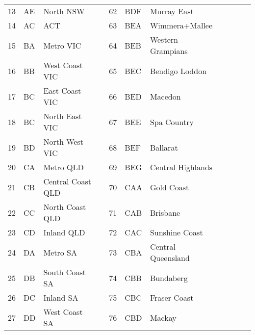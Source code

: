 \begin{table}[H]
{\begin{tabular}{lllllllllll}
				13	& AE & North NSW 			&  & 62  & BDF & Murray East &&&&\\
				14	& AC & ACT					&  & 63  & BEA & Wimmera+Mallee &&&&\\
				15	& BA & Metro VIC			&  & 64  & BEB & Western Grampians &&&&\\ 		
				16	& BB & West Coast VIC		&  & 65  & BEC & Bendigo Loddon &&&&\\
				17	& BC & East Coast VIC		&  & 66  & BED & Macedon &&&&\\ 
				18	& BC & North East VIC		&  & 67  & BEE & Spa Country &&&&\\ 
				19	& BD & North West VIC		&  & 68  & BEF & Ballarat &&&&\\
				20  & CA & Metro QLD			&  & 69  & BEG & Central Highlands &&&&\\
				21  & CB & Central Coast QLD	&  & 70  & CAA & Gold Coast &&&&\\
				22  & CC & North Coast QLD		&  & 71  & CAB & Brisbane &&&&\\
				23  & CD & Inland QLD			&  & 72  & CAC & Sunshine Coast &&&&\\
				24	& DA & Metro SA				&  & 73  & CBA & Central Queensland &&&&\\	
				25	& DB & South Coast SA		&  & 74  & CBB & Bundaberg &&&&\\	
				26	& DC & Inland SA			&  & 75  & CBC & Fraser Coast &&&&\\	
				27	& DD & West Coast SA		&  & 76  & CBD & Mackay &&&&\\	
				

\end{tabular}}
\end{table}
